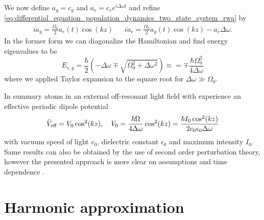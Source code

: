 We now define $a_g=c_g$ and $a_e=c_ee^{i\Delta\omega t}$ and refine
\cref{eq:differential_equation_population_dynamics_two_state_system_rwa} by
\begin{align}
  i\dot{a}_g=\frac{\Omega_0}{2}a_e(t)\cos(kz) &&
  i\dot{a}_e=\frac{\Omega_0}{2}a_g(t)\cos(kz)-a_e\Delta\omega
  \label{eq:differential_equation_population_dynamics_two_state_system_shift}.
\end{align}
In the former form we can diagonalize the Hamiltonian and find energy
eigenvalues to be
\begin{equation}
  E_{e,g}
  =\frac{\hbar}{2}\left(-\Delta\omega\mp\sqrt{\Omega_0^2+\Delta\omega^2}\right)
  \approx
  =\mp\frac{\hbar\Omega_0^2}{4\Delta\omega}
  \label{eq:eigenvalues_energy_light_shift}
\end{equation}
where we applied Taylor expansion to the square root for
$\Delta\omega\gg\Omega_0$.

In summary atoms in an external off-resonant light field with experience an
effective periodic dipole potential
\begin{equation}
  \hat{V}_\text{eff}
  =V_0\cos^2(kz)
  \qc
  V_0
  =\frac{\hbar\Omega}{4\Delta\omega}\cos^2(kz)
  =\frac{\hbar I_0\cos^2(kz)}{2c_0\epsilon_0\Delta\omega}
  \label{eq:potential_effective}
\end{equation}
with vacuum speed of light $c_0$, dielectric constant $\epsilon_0$ and
maximum intensity $I_0$. Same results can also be obtained by the use of
second order perturbation theory, however the presented approach is more
clear on assumptions and time dependence \cite{Grimm2008}.

\section{Harmonic approximation}

